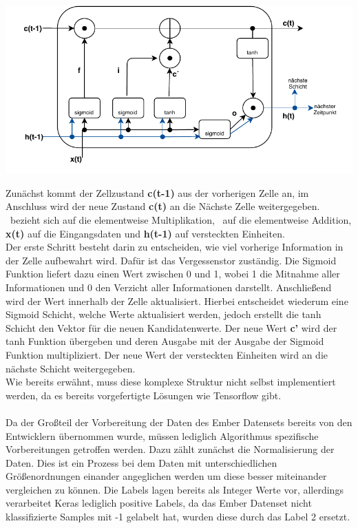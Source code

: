 \documentclass[
    12pt, %
    DIV10,
    ngerman, %
    a4paper, %
    oneside, %
    titlepage, %
    parskip=half, %
    headings=normal, %
    listof=totoc, %
    bibliography=totoc, %
    index=totoc, %
    captions=tableheading, %
    final %
]{scrreprt}
\begin{document}
\begin{center}
\includegraphics[scale=0.9]{img/lstm.pdf}
\label{fig:lstm}
\end{center}
Zunächst kommt der Zellzustand \textbf{c(t-1)} aus der vorherigen Zelle an, im Anschluss wird der neue Zustand \textbf{c(t)} an die Nächste Zelle weitergegeben. \odot \ bezieht sich auf die elementweise Multiplikation, \oplus \ auf die elementweise Addition, \textbf{x(t)} auf die Eingangsdaten und \textbf{h(t-1)} auf versteckten Einheiten.\\
Der erste Schritt besteht darin zu entscheiden, wie viel vorherige Information in der Zelle aufbewahrt wird. Dafür ist das Vergessenstor zuständig. Die Sigmoid Funktion liefert dazu einen Wert zwischen 0 und 1, wobei 1 die Mitnahme aller Informationen und 0 den Verzicht aller Informationen darstellt. Anschlie{\ss}end wird der Wert innerhalb der Zelle aktualisiert. Hierbei entscheidet wiederum eine Sigmoid Schicht, welche Werte aktualisiert werden, jedoch erstellt die tanh Schicht den Vektor für die neuen Kandidatenwerte. Der neue Wert \textbf{c'}  wird der tanh Funktion übergeben und deren Ausgabe mit der Ausgabe der Sigmoid Funktion multipliziert. Der neue Wert der versteckten Einheiten wird an die nächste Schicht weitergegeben.\\
Wie bereits erwähnt, muss diese komplexe Struktur nicht selbst implementiert werden, da es bereits vorgefertigte Lösungen wie Tensorflow gibt.
\\\\
Da der Gro{\ss}teil der Vorbereitung der Daten des Ember Datensets bereits von den Entwicklern übernommen wurde, müssen lediglich  Algorithmus spezifische Vorbereitungen getroffen werden. Dazu zählt zunächst die Normalisierung der Daten. Dies ist ein Prozess bei dem Daten mit unterschiedlichen Grö{\ss}enordnungen einander angeglichen werden um diese besser miteinander vergleichen zu können. Die Labels lagen bereits als Integer Werte vor, allerdings verarbeitet Keras lediglich positive Labels, da das Ember Datenset nicht klassifizierte Samples mit -1 gelabelt hat, wurden diese durch das Label 2 ersetzt. \\
\end{document}
